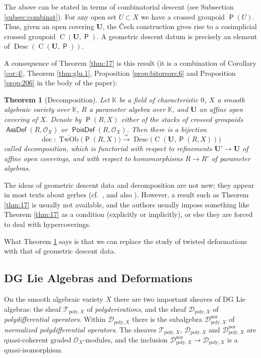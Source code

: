 \documentclass[a4paper, 10pt]{amsart}
\newtheorem{thm}[equation]{Theorem}
\theoremstyle{definition}
\numberwithin{equation}{section}
\newcommand{\iso}{\xrightarrow{\simeq}}
\newcommand{\opn}{\operatorname}
\newcommand{\cat}[1]{\operatorname{\mathsf{#1}}}
\newcommand{\ol}{\overline}
\newcommand{\mcal}[1]{\mathcal{#1}}
\newcommand{\mrm}[1]{\mathrm{#1}}
\newcommand{\mbb}[1]{\mathbb{#1}}
\newcommand{\bsym}[1]{\boldsymbol{#1}}
\newcommand{\K}{\mbb{K}}
\newcommand{\OX}{\mcal{O}_X}
\newcommand{\twocat}[1]{\operatorname{\bsym{\cat{#1}}}}
\newcommand{\lb}{\linebreak}
\begin{document}
The above can be stated in terms of combinatorial descent (see Subsection
\ref{subsec:combinat}). 
For any open set $U \subset X$ we have a crossed groupoid
$\twocat{P}(U)$. Thus, given an open
covering $\bsym{U}$, the \v{C}ech construction gives rise to a cosimplicial
crossed groupoid $\opn{C}(\bsym{U}, \twocat{P})$. A geometric descent
datum is precisely an element of 
$\opn{Desc}(\opn{C}(\bsym{U}, \twocat{P}))$.

A consequence of Theorem \ref{thm:17} is this result (it is a combination of 
Corollary \ref{cor:4}, Theorem \ref{thm:glu.1}, Proposition
\ref{prop:bitorsors.6} and Proposition \ref{prop:206} in the body of the
paper): 

\begin{thm}[Decomposition] \label{thm:intro.101}
Let $\K$ be a field of characteristic $0$, $X$ a smooth algebraic variety
over $\K$, $R$ a parameter algebra over $\K$, and $\bsym{U}$ an
affine open covering of $X$. Denote by $\twocat{P}(R, X)$ either of the stacks
of crossed groupoids \lb $\twocat{AssDef}(R, \mcal{O}_X)$ or
$\twocat{PoisDef}(R, \mcal{O}_X)$. Then there is a bijection
\[ \ol{\opn{dec}} : 
\ol{\opn{TwOb}}  \bigl( \twocat{P}(R, X) \bigr) \iso
\ol{\opn{Desc}} \bigl( \opn{C} (\bsym{U}, \twocat{P}(R, X)) \bigr)  \]
called {\em decomposition}, which is functorial with respect to refinements
$\bsym{U}' \to \bsym{U}$ of affine open coverings, and with respect to
homomorphisms $R \to R'$ of parameter algebras.
\end{thm}

The ideas of geometric descent data and decomposition are not new; they appear
in most texts about gerbes (cf.\ \cite[Section IV.3.5]{Gi}, and also
\cite{Br, Ko2, BGNT1, DP1}). However, a result such
as Theorem \ref{thm:17} is usually not available, and the authors usually impose
something like Theorem \ref{thm:17} as a condition (explicitly or
implicitly), or else they are forced to deal with hypercoverings.

What Theorem \ref{thm:intro.101} says is that we can replace the study of
twisted deformations with that of geometric descent data. 


\subsection{DG Lie Algebras and Deformations} \label{subsec:geom}
On the smooth algebraic variety $X$ there are two important sheaves of DG Lie
algebras: the sheaf $\mcal{T}_{\mrm{poly}, X}$ of {\em polyderivations}, and the
sheaf $\mcal{D}_{\mrm{poly}, X}$ of {\em polydifferential operators}. 
Within $\mcal{D}_{\mrm{poly}, X}$ there is the subalgebra
$\mcal{D}_{\mrm{poly}, X}^{\mrm{nor}}$ 
of {\em normalized polydifferential operators}. 
The sheaves $\mcal{T}_{\mrm{poly}, X}$, $\mcal{D}_{\mrm{poly}, X}$ and
$\mcal{D}_{\mrm{poly}, X}^{\mrm{nor}}$
are quasi-coherent graded $\OX$-modules, and the inclusion 
$\mcal{D}_{\mrm{poly}, X}^{\mrm{nor}} \to \mcal{D}_{\mrm{poly}, X}$
is a quasi-isomorphism. 
\end{document}
